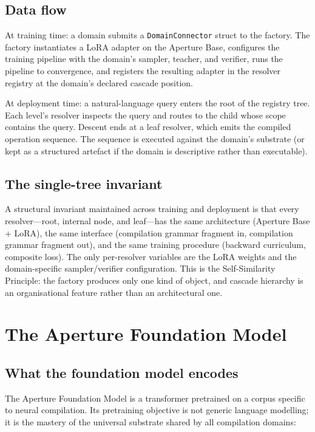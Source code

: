 \documentclass[twocolumn,11pt,a4paper]{article}
\begin{document}
\subsection{Data flow}

At training time: a domain submits a \texttt{DomainConnector} struct to the factory. The factory instantiates a LoRA adapter on the Aperture Base, configures the training pipeline with the domain's sampler, teacher, and verifier, runs the pipeline to convergence, and registers the resulting adapter in the resolver registry at the domain's declared cascade position.

At deployment time: a natural-language query enters the root of the registry tree. Each level's resolver inspects the query and routes to the child whose scope contains the query. Descent ends at a leaf resolver, which emits the compiled operation sequence. The sequence is executed against the domain's substrate (or kept as a structured artefact if the domain is descriptive rather than executable).

\subsection{The single-tree invariant}

A structural invariant maintained across training and deployment is that every resolver---root, internal node, and leaf---has the same architecture (Aperture Base + LoRA), the same interface (compilation grammar fragment in, compilation grammar fragment out), and the same training procedure (backward curriculum, composite loss). The only per-resolver variables are the LoRA weights and the domain-specific sampler/verifier configuration. This is the Self-Similarity Principle: the factory produces only one kind of object, and cascade hierarchy is an organisational feature rather than an architectural one.


\section{The Aperture Foundation Model}
\label{sec:aperture}

\subsection{What the foundation model encodes}

The Aperture Foundation Model is a transformer pretrained on a corpus specific to neural compilation. Its pretraining objective is not generic language modelling; it is the mastery of the universal substrate shared by all compilation domains:
\end{document}
